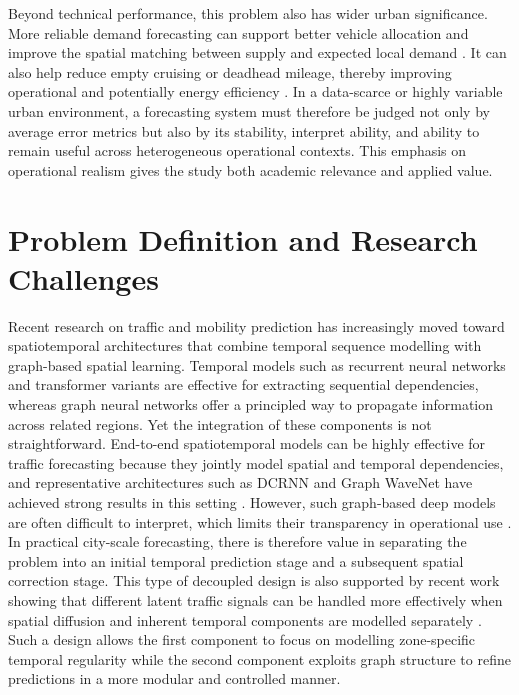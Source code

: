 \documentclass[12pt,a4paper]{report}
\begin{document}
Beyond technical performance, this problem also has wider urban significance. More reliable demand forecasting can support better vehicle allocation and improve the spatial matching between supply and expected local demand \cite{li2024predictability,ye2021online}. It can also help reduce empty cruising or deadhead mileage, thereby improving operational and potentially energy efficiency \cite{kontou2020empty}. In a data-scarce or highly variable urban environment, a forecasting system must therefore be judged not only by average error metrics but also by its stability, interpret ability, and ability to remain useful across heterogeneous operational contexts. This emphasis on operational realism gives the study both academic relevance and applied value.

\section{Problem Definition and Research Challenges}

Recent research on traffic and mobility prediction has increasingly moved toward spatiotemporal architectures that combine temporal sequence modelling with graph-based spatial learning.\cite{8903252} Temporal models such as recurrent neural networks and transformer variants are effective for extracting sequential dependencies\cite{info15090517,rnn_evolution_2024}, whereas graph neural networks offer a principled way to propagate information across related regions\cite{9046288}. Yet the integration of these components is not straightforward. End-to-end spatiotemporal models can be highly effective for traffic forecasting because they jointly model spatial and temporal dependencies, and representative architectures such as DCRNN and Graph WaveNet have achieved strong results in this setting \cite{li2018dcrnn,jiang2022survey}. However, such graph-based deep models are often difficult to interpret, which limits their transparency in operational use \cite{garcia2023explainability}. In practical city-scale forecasting, there is therefore value in separating the problem into an initial temporal prediction stage and a subsequent spatial correction stage. This type of decoupled design is also supported by recent work showing that different latent traffic signals can be handled more effectively when spatial diffusion and inherent temporal components are modelled separately \cite{shao2022d2stgnn}. Such a design allows the first component to focus on modelling zone-specific temporal regularity while the second component exploits graph structure to refine predictions in a more modular and controlled manner.
\end{document}
